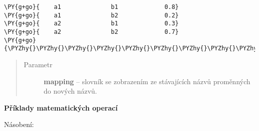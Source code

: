 \begin{fulllineitems}
\begin{fulllineitems}
\begin{Verbatim}[commandchars=\\\{\}]
\PY{g+go}{    a1              b1             0.8}
\PY{g+go}{    a1              b2             0.2}
\PY{g+go}{    a2              b1             0.3}
\PY{g+go}{    a2              b2             0.7}
\PY{g+go}{\PYZhy{}\PYZhy{}\PYZhy{}\PYZhy{}\PYZhy{}\PYZhy{}\PYZhy{}\PYZhy{}\PYZhy{}\PYZhy{}\PYZhy{}\PYZhy{}\PYZhy{}\PYZhy{}\PYZhy{}\PYZhy{}\PYZhy{}\PYZhy{}\PYZhy{}\PYZhy{}\PYZhy{}\PYZhy{}\PYZhy{}\PYZhy{}\PYZhy{}\PYZhy{}\PYZhy{}\PYZhy{}\PYZhy{}\PYZhy{}\PYZhy{}\PYZhy{}\PYZhy{}\PYZhy{}\PYZhy{}\PYZhy{}\PYZhy{}\PYZhy{}\PYZhy{}\PYZhy{}\PYZhy{}\PYZhy{}\PYZhy{}\PYZhy{}\PYZhy{}\PYZhy{}\PYZhy{}\PYZhy{}\PYZhy{}\PYZhy{}}
\end{Verbatim}
\begin{quote}\begin{description}
\item[{Parametr}] \leavevmode
\textbf{mapping} -- slovník se zobrazením ze stávajících názvů proměnných do nových názvů.

\end{description}\end{quote}

\end{fulllineitems}


\textbf{Příklady matematických operací}

Násobení:


\end{fulllineitems}
